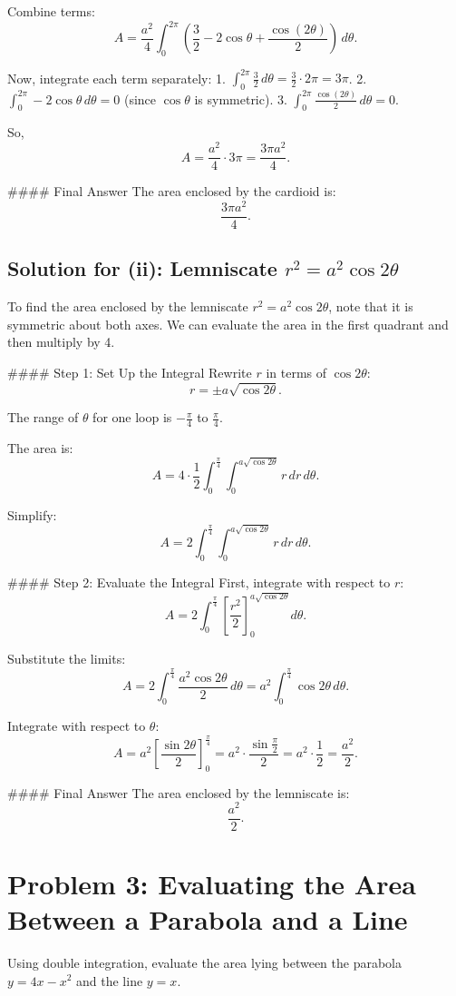 \documentclass{article}
\begin{document}
Combine terms:
\[
A = \frac{a^2}{4} \int_0^{2\pi} \left( \frac{3}{2} - 2\cos \theta + \frac{\cos(2\theta)}{2} \right) \, d\theta.
\]

Now, integrate each term separately:
1. \( \int_0^{2\pi} \frac{3}{2} \, d\theta = \frac{3}{2} \cdot 2\pi = 3\pi \).
2. \( \int_0^{2\pi} -2\cos \theta \, d\theta = 0 \) (since \( \cos \theta \) is symmetric).
3. \( \int_0^{2\pi} \frac{\cos(2\theta)}{2} \, d\theta = 0 \).

So,
\[
A = \frac{a^2}{4} \cdot 3\pi = \frac{3\pi a^2}{4}.
\]

#### Final Answer
The area enclosed by the cardioid is:
\[
\boxed{\frac{3\pi a^2}{4}}.
\]

\subsection*{Solution for (ii): Lemniscate \( r^2 = a^2 \cos 2\theta \)}
To find the area enclosed by the lemniscate \( r^2 = a^2 \cos 2\theta \), note that it is symmetric about both axes. We can evaluate the area in the first quadrant and then multiply by 4.

#### Step 1: Set Up the Integral
Rewrite \( r \) in terms of \( \cos 2\theta \):
\[
r = \pm a \sqrt{\cos 2\theta}.
\]

The range of \( \theta \) for one loop is \( -\frac{\pi}{4} \) to \( \frac{\pi}{4} \).

The area is:
\[
A = 4 \cdot \frac{1}{2} \int_0^{\frac{\pi}{4}} \int_0^{a \sqrt{\cos 2\theta}} r \, dr \, d\theta.
\]

Simplify:
\[
A = 2 \int_0^{\frac{\pi}{4}} \int_0^{a \sqrt{\cos 2\theta}} r \, dr \, d\theta.
\]

#### Step 2: Evaluate the Integral
First, integrate with respect to \( r \):
\[
A = 2 \int_0^{\frac{\pi}{4}} \left[ \frac{r^2}{2} \right]_0^{a \sqrt{\cos 2\theta}} d\theta.
\]

Substitute the limits:
\[
A = 2 \int_0^{\frac{\pi}{4}} \frac{a^2 \cos 2\theta}{2} \, d\theta = a^2 \int_0^{\frac{\pi}{4}} \cos 2\theta \, d\theta.
\]

Integrate with respect to \( \theta \):
\[
A = a^2 \left[ \frac{\sin 2\theta}{2} \right]_0^{\frac{\pi}{4}} = a^2 \cdot \frac{\sin \frac{\pi}{2}}{2} = a^2 \cdot \frac{1}{2} = \frac{a^2}{2}.
\]

#### Final Answer
The area enclosed by the lemniscate is:
\[
\boxed{\frac{a^2}{2}}.
\]


\section*{Problem 3: Evaluating the Area Between a Parabola and a Line}
Using double integration, evaluate the area lying between the parabola \( y = 4x - x^2 \) and the line \( y = x \).
\end{document}

